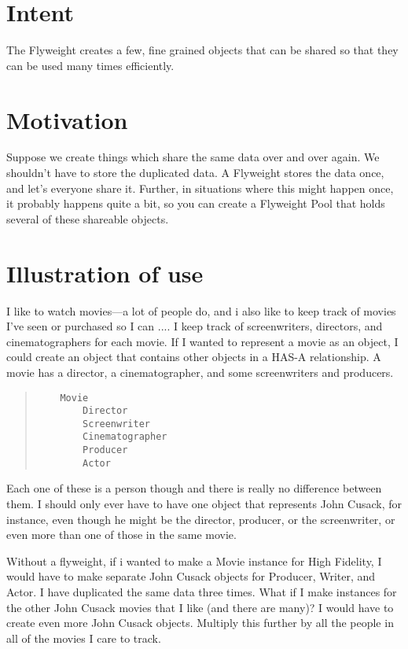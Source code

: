 
    \section{Intent}

The Flyweight creates a few, fine grained objects that can be
shared so that they can be used many times efficiently.
 
    \section{Motivation}
    
Suppose we create things which share the same data over and over
again.  We shouldn't have to store the duplicated data. A Flyweight
stores the data once, and let's everyone share it. Further, in
situations where this might happen once, it probably happens quite a
bit, so you can create a Flyweight Pool that holds several of these
shareable objects.

	\section{Illustration of use}

I like to watch movies---a lot of people do, and i also like to keep
track of movies I've seen or purchased so I can .... I keep track of
screenwriters, directors, and cinematographers for each movie.  If I
wanted to represent a movie as an object, I could create an object
that contains other objects in a HAS-A relationship.  A movie has a
director, a cinematographer, and some screenwriters and producers.

\begin{quote}
\begin{verbatim}
	Movie
		Director
		Screenwriter
		Cinematographer
		Producer
		Actor
\end{verbatim}
\end{quote}
		

Each one of these is a person though and there is really no difference
between them.  I should only ever have to have one object that
represents John Cusack, for instance, even though he might be the
director, producer, or the screenwriter, or even more than one of
those in the same movie.

Without a flyweight, if i wanted to make a Movie instance for High
Fidelity, I would have to make separate John Cusack objects for
Producer, Writer, and Actor.  I have duplicated the same data three
times.  What if I make instances for the other John Cusack movies that
I like (and there are many)?  I would have to create even more John
Cusack objects.  Multiply this further by all the people in all of the
movies I care to track.

